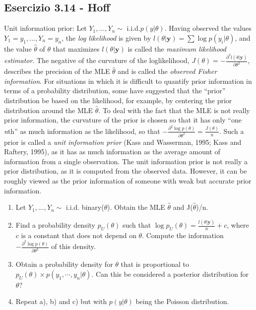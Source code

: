 \subsection{Esercizio 3.14 - Hoff}

Unit information prior: Let $Y_1,...,Y_n \sim $ i.i.d.$p(y|\theta)$. Having
observed the values $Y_1=y_1,...,Y_n=y_n$, the \textit{log likelihood} is given
by $l(\theta|\textbf{y})=\sum\log p(y_{i}|\theta)$, and the value $\hat{\theta}$ of
$\theta$ that maximizes $l(\theta|\textbf{y})$ is called the \textit{maximum
likelihood estimator}. The negative of the curvature of the loglikelihood,
$J(\theta)=-\frac{\partial^{2}l(\theta| \textbf{y})}{\partial\theta^{2}}$, describes
the precision of the MLE $\hat{\theta}$ and is called the \textit{observed
Fisher information}. For situations in which it is difficult to quantify
prior information in terms of a probability distribution, some have
suggested that the \textquotedblleft prior\textquotedblright{} distribution
be based on the likelihood, for example, by centering the prior distribution
around the MLE $\hat{\theta}$. To deal with the fact that the MLE
is not really prior information, the curvature of the prior is chosen
so that it has only \textquotedblleft one \textit{n}th\textquotedblright{}
as much information as the likelihood, so that $-\frac{\partial^{2}\log p(\theta)}{\partial\theta^{2}}=\frac{J(\theta)}{n}$. Such
a prior is called a \textit{unit information prior} (Kass and Wasserman, 1995;
Kass and Raftery, 1995), as it has as much information
as the average amount of information from a single observation. The
unit information prior is not really a prior distribution, as it is
computed from the observed data. However, it can be roughly viewed
as the prior information of someone with weak but accurate prior information. 

\begin{enumerate}[label=\alph*)]
\item Let $Y_1, . . . , Y_n \sim $ i.i.d. binary($\theta$). Obtain the MLE $\hat{\theta}$
and J($\hat{\theta}$)/n.

\item Find a probability density $p_U(\theta)$ such that $\log p_U(\theta) = \frac{l(\theta| \textbf{y})}{n}+c$, where $c$ is a constant that does not depend on $\theta$. Compute the information $-\frac{\partial^{2}\log p(\theta)}{\partial\theta^{2}}$ of this density. 

\item Obtain a probability density for $\theta$ that is proportional to $p_U(\theta) \times p(y_1,\cdots,y_n|\theta)$. Can this be considered a posterior distribution for $\theta$?

\item Repeat a), b) and c) but with $p(y|\theta)$ being the Poisson distribution.

\end{enumerate}

